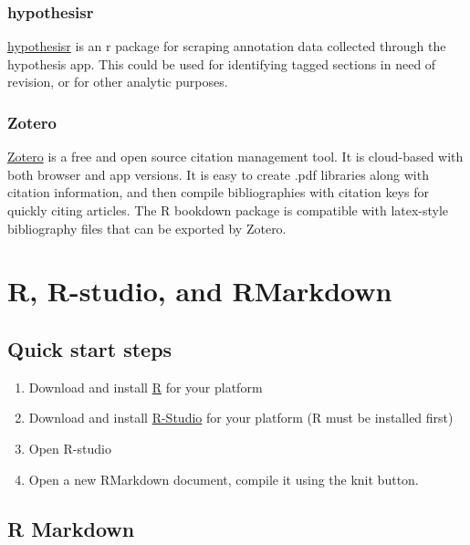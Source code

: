 \documentclass[]{book}
\providecommand{\tightlist}{%
  \setlength{\itemsep}{0pt}\setlength{\parskip}{0pt}}
\theoremstyle{definition}
\theoremstyle{definition}
\theoremstyle{definition}
\theoremstyle{remark}
\begin{document}
\subsection{hypothesisr}\label{hypothesisr}

\href{https://github.com/mdlincoln/hypothesisr}{hypothesisr} is an r
package for scraping annotation data collected through the hypothesis
app. This could be used for identifying tagged sections in need of
revision, or for other analytic purposes.

\subsection{Zotero}\label{zotero}

\href{https://www.zotero.org}{Zotero} is a free and open source citation
management tool. It is cloud-based with both browser and app versions.
It is easy to create .pdf libraries along with citation information, and
then compile bibliographies with citation keys for quickly citing
articles. The R bookdown package is compatible with latex-style
bibliography files that can be exported by Zotero.

\chapter{R, R-studio, and RMarkdown}\label{r-r-studio-and-rmarkdown}

\section{Quick start steps}\label{quick-start-steps}

\begin{enumerate}
\def\labelenumi{\arabic{enumi}.}
\tightlist
\item
  Download and install \href{https://www.r-project.org}{R} for your
  platform
\item
  Download and install \href{https://www.rstudio.com}{R-Studio} for your
  platform (R must be installed first)
\item
  Open R-studio
\item
  Open a new RMarkdown document, compile it using the knit button.
\end{enumerate}

\section{R Markdown}\label{r-markdown}
\end{document}
